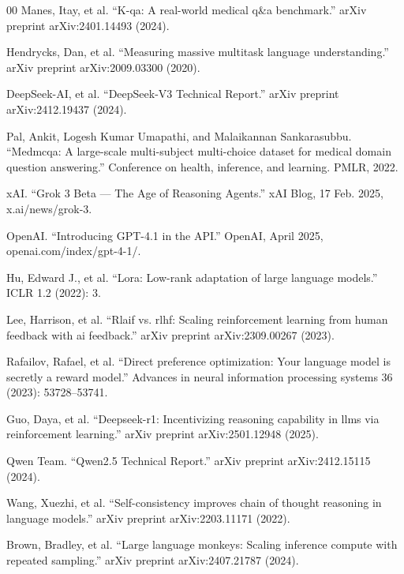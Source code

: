 \documentclass[manuscript,screen,review]{acmart}
\begin{document}
\begin{thebibliography}{00}
Manes, Itay, et al. ``K-qa: A real-world medical q\&a benchmark.'' arXiv preprint arXiv:2401.14493 (2024).

Hendrycks, Dan, et al. ``Measuring massive multitask language understanding.'' arXiv preprint arXiv:2009.03300 (2020).

DeepSeek-AI, et al. ``DeepSeek-V3 Technical Report.'' arXiv preprint arXiv:2412.19437 (2024).

Pal, Ankit, Logesh Kumar Umapathi, and Malaikannan Sankarasubbu. ``Medmcqa: A large-scale multi-subject multi-choice dataset for medical domain question answering.'' Conference on health, inference, and learning. PMLR, 2022.

xAI. ``Grok 3 Beta --- The Age of Reasoning Agents.'' xAI Blog, 17 Feb. 2025, x.ai/news/grok-3.

OpenAI. ``Introducing GPT-4.1 in the API.'' OpenAI, April 2025, openai.com/index/gpt-4-1/.

Hu, Edward J., et al. ``Lora: Low-rank adaptation of large language models.'' ICLR 1.2 (2022): 3.

Lee, Harrison, et al. ``Rlaif vs. rlhf: Scaling reinforcement learning from human feedback with ai feedback.'' arXiv preprint arXiv:2309.00267 (2023).

Rafailov, Rafael, et al. ``Direct preference optimization: Your language model is secretly a reward model.'' Advances in neural information processing systems 36 (2023): 53728--53741.

Guo, Daya, et al. ``Deepseek-r1: Incentivizing reasoning capability in llms via reinforcement learning.'' arXiv preprint arXiv:2501.12948 (2025).

Qwen Team. ``Qwen2.5 Technical Report.'' arXiv preprint arXiv:2412.15115 (2024).

Wang, Xuezhi, et al. ``Self-consistency improves chain of thought reasoning in language models.'' arXiv preprint arXiv:2203.11171 (2022).

Brown, Bradley, et al. ``Large language monkeys: Scaling inference compute with repeated sampling.'' arXiv preprint arXiv:2407.21787 (2024).

\end{thebibliography}
\end{document}
